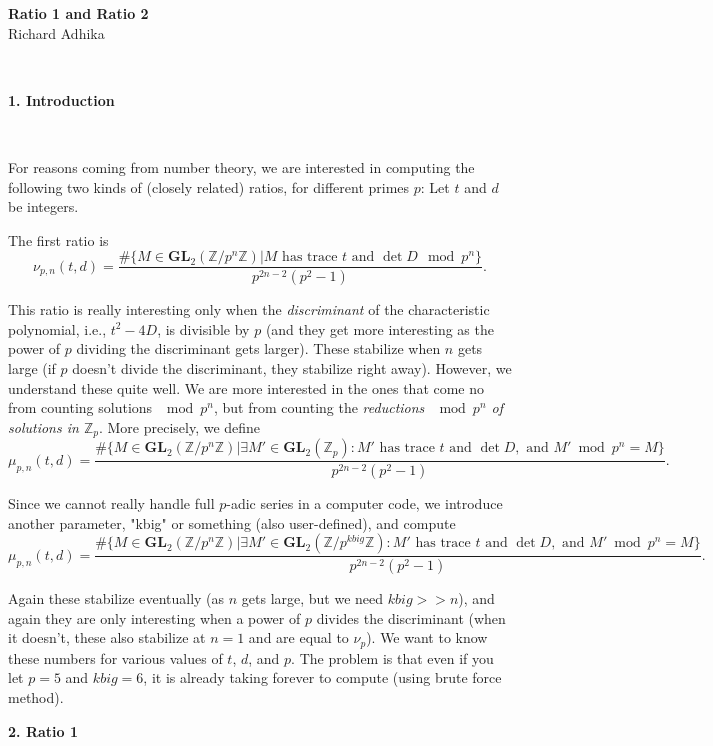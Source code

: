 \documentclass[letterpaper,12pt]{article}
\newcommand{\Z}{\mathbb{Z}}
\newcommand{\GL}{\mathbf {GL}}
\begin{document}
\begin{center}
    {\bf \LARGE Ratio 1 and Ratio 2} \\
    Richard Adhika
\end{center}

\

{\bf \LARGE 1. Introduction}

\

For reasons coming from number theory, we are interested in computing the following two kinds of (closely related) ratios, for different primes $p$: 
Let $t$ and $d$ be integers.  

The first ratio is 
\[
\nu_{p, n} (t, d) = \frac{\#\{M\in \GL_2(\Z/p^n\Z) \vert M \text{ has trace } t \text{ and }  \det  D  \mod p^n\} }{p^{2n-2}(p^2-1)}.
\]

This ratio is really interesting only when the \emph{discriminant} of the characteristic polynomial, i.e., 
$t^2-4D$, is divisible by $p$ (and they get more interesting as the power of $p$ dividing the discriminant gets larger). 
These stabilize when $n$ gets large (if $p$ doesn't divide the discriminant, they stabilize right away). 
However,  we understand these quite well. We are more interested in the ones that come no from counting solutions $\mod p^n$, but from counting the \emph{reductions  $\mod p^n$ of solutions in $\Z_p$}. 
More precisely, we define 
\[
\mu_{p, n} (t, d) = \frac{\#\{M\in \GL_2(\Z/p^n\Z) \vert \exists M'\in \GL_2(\Z_p):  M' \text{ has trace } t \text{ and }  \det  D, \text { and } M' \bmod p^n = M \} } 
{p^{2n-2}(p^2-1)}.
\]

Since we cannot really handle full $p$-adic series in a computer code, we introduce another parameter, "kbig" or something (also user-defined), and compute 
\[
\mu_{p, n} (t, d) = \frac{\#\{M\in \GL_2(\Z/p^n\Z) \vert \exists M'\in \GL_2(\Z/p^{kbig}\Z):  M' \text{ has trace } t \text{ and }  \det  D, \text { and } M' \bmod p^n = M \} } 
{p^{2n-2}(p^2-1)}.
\]

Again these stabilize eventually (as $n$ gets large, but we need $kbig>>n$), and again they are only interesting when a power of $p$ divides the discriminant (when it doesn't, these also stabilize at $n=1$ and are equal to $\nu_p$). 
We want to know these numbers for various values of $t$, $d$, and $p$.
The problem is that even if you let $p=5$ and $kbig=6$, it is already taking forever to compute 
(using brute force method). 

\vspace{0.6in}

{\bf \LARGE 2. Ratio 1}
\end{document}
